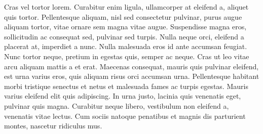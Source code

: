 Cras vel tortor lorem. Curabitur enim ligula, ullamcorper at eleifend
a, aliquet quis tortor. Pellentesque aliquam, nisl sed consectetur
pulvinar, purus augue aliquam tortor, vitae ornare sem magna vitae
augue. Suspendisse magna eros, sollicitudin ac consequat sed, pulvinar
sed turpis. Nulla neque orci, eleifend a placerat at, imperdiet a
nunc. Nulla malesuada eros id ante accumsan feugiat. Nunc tortor
neque, pretium in egestas quis, semper ac neque. Cras ut leo vitae
arcu aliquam mattis a et erat. Maecenas consequat, mauris quis
pulvinar eleifend, est urna varius eros, quis aliquam risus orci
accumsan urna. Pellentesque habitant morbi tristique senectus et netus
et malesuada fames ac turpis egestas. Mauris varius eleifend elit quis
adipiscing. In urna justo, lacinia quis venenatis eget, pulvinar quis
magna. Curabitur neque libero, vestibulum non eleifend a, venenatis
vitae lectus. Cum sociis natoque penatibus et magnis dis parturient
montes, nascetur ridiculus mus.
\endrule

